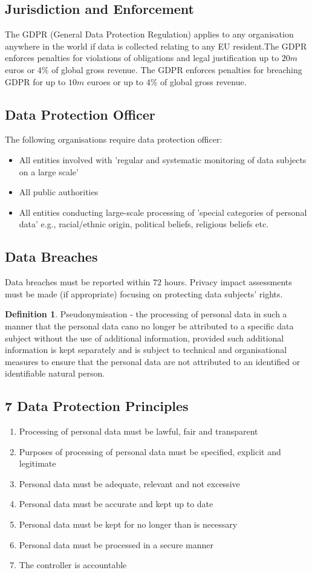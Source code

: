 \documentclass[a4paper]{article}
\theoremstyle{plain}
\theoremstyle{definition}
\newtheorem{defn}{Definition}[section]
\theoremstyle{remark}
\begin{document}
\subsection{Jurisdiction and Enforcement}
The GDPR (General Data Protection Regulation) applies to any organisation anywhere in the world if data is collected relating to any EU resident.The GDPR enforces penalties for violations of obligations and legal justification up to $20m$ euros or $4\%$ of global gross revenue. The GDPR enforces penalties for breaching GDPR for up to $10m$ euroes or up to $4\%$ of global gross revenue.
\subsection{Data Protection Officer}
The following organisations require data protection officer:
\begin{itemize}
	\item All entities involved with 'regular and systematic monitoring of data subjects on a large scale'
	\item All public authorities
	\item All entities conducting large-scale processing of 'special categories of personal data' e.g., racial/ethnic origin, political beliefs, religious beliefs etc.
\end{itemize}
\subsection{Data Breaches}
Data breaches must be reported within $72$ hours. Privacy impact assessments must be made (if appropriate) focusing on protecting data subjects' rights.
\begin{defn}
Pseudonymisation - the processing of personal data in such a manner that the personal data cano no longer be attributed to a specific data subject without the use of additional information, provided such additional information is kept separately and is subject to technical and organisational measures to ensure that the personal data are not attributed to an identified or identifiable natural person.
\end{defn}
\subsection{7 Data Protection Principles}
\begin{enumerate}
	\item Processing of personal data must be lawful, fair and transparent
	\item Purposes of processing of personal data must be specified, explicit and legitimate
	\item Personal data must be adequate, relevant and not excessive
	\item Personal data must be accurate and kept up to date
	\item Personal data must be kept for no longer than is necessary
	\item Personal data must be processed in a secure manner
	\item The controller is accountable
\end{enumerate}
\end{document}
